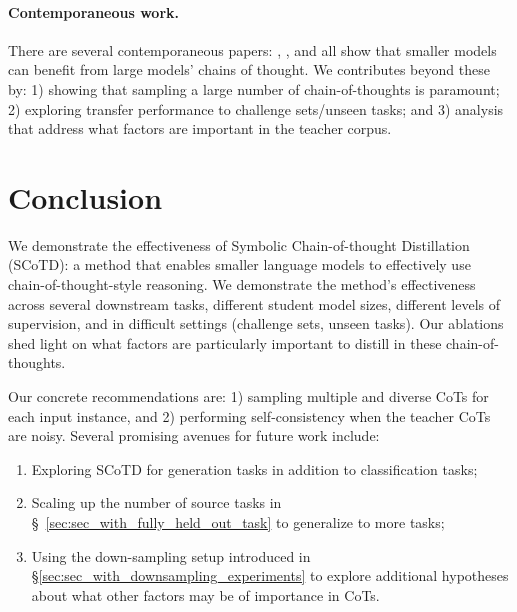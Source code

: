 \documentclass[11pt]{article}
\newcommand\jack[1]{{\color{orange}[#1]$_{Jack}$}}
\newcommand\yj[1]{{\color{olive}[#1]$_{YJ}$}}
\begin{document}
\paragraph{Contemporaneous work.} There are several contemporaneous papers: \citet{huang2022large}, \citet{magister2022teaching}, and \citet{ho2022large} all show that smaller models can benefit from large models' chains of thought.
We contributes beyond these by: 1) showing that sampling a large number of chain-of-thoughts is paramount; 2) exploring transfer performance to challenge sets/unseen tasks; and 3) analysis that address what factors are important in the teacher corpus.

\section{Conclusion}

We demonstrate the effectiveness of Symbolic Chain-of-thought Distillation (SCoTD): a method that enables smaller language models to effectively use chain-of-thought-style reasoning. We demonstrate the method's effectiveness across several downstream tasks, different student model sizes, different levels of supervision, and in difficult settings (challenge sets, unseen tasks). Our ablations shed light on what factors are particularly important to distill in these chain-of-thoughts. 

Our concrete recommendations are: 1) sampling multiple and diverse CoTs for each input instance, and 2) performing self-consistency when the teacher CoTs are noisy.
Several promising avenues for future work include:
\begin{enumerate}[leftmargin=*,topsep=1ex,itemsep=1ex,partopsep=1ex,parsep=1ex]
\item Exploring SCoTD for generation tasks in addition to classification tasks;
\item Scaling up the number of source tasks in \S~\ref{sec:sec_with_fully_held_out_task} to generalize to more tasks; %
\item Using the down-sampling setup introduced in \S\ref{sec:sec_with_downsampling_experiments} to explore additional hypotheses about what other factors may be of importance in CoTs.
\end{enumerate}
\end{document}
